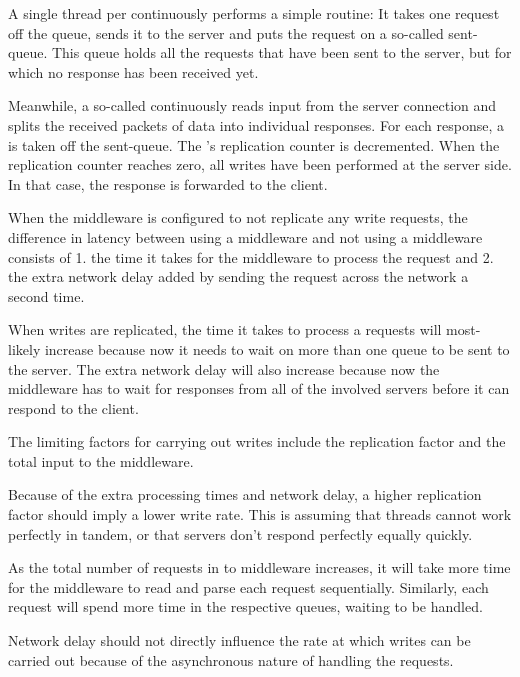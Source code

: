 \documentclass[11pt]{article}
\begin{document}
A single thread per  continuously performs a simple routine:
It takes one request off the queue, sends it to the server and puts the request on a so-called sent-queue.
This queue holds all the requests that have been sent to the server, but for which no response has been received yet.

Meanwhile, a so-called  continuously reads input from the server connection and splits the received packets of data into individual responses.
For each response, a  is taken off the sent-queue.
The 's replication counter is decremented.
When the replication counter reaches zero, all writes have been performed at the server side.
In that case, the response is forwarded to the client.


When the middleware is configured to not replicate any write requests, the difference in latency between using a middleware and not using a middleware consists of 1. the time it takes for the middleware to process the request and 2. the extra network delay added by sending the request across the network a second time.

When writes are replicated, the time it takes to process a requests will most-likely increase because now it needs to wait on more than one queue to be sent to the server.
The extra network delay will also increase because now the middleware has to wait for responses from all of the involved servers before it can respond to the client.

The limiting factors for carrying out writes include the replication factor and the total input to the middleware.

Because of the extra processing times and network delay, a higher replication factor should imply a lower write rate.
This is assuming that threads cannot work perfectly in tandem, or that servers don't respond perfectly equally quickly.

As the total number of requests in to middleware increases, it will take more time for the middleware to read and parse each request sequentially.
Similarly, each request will spend more time in the respective queues, waiting to be handled.

Network delay should not directly influence the rate at which writes can be carried out because of the asynchronous nature of handling the requests.
\end{document}
